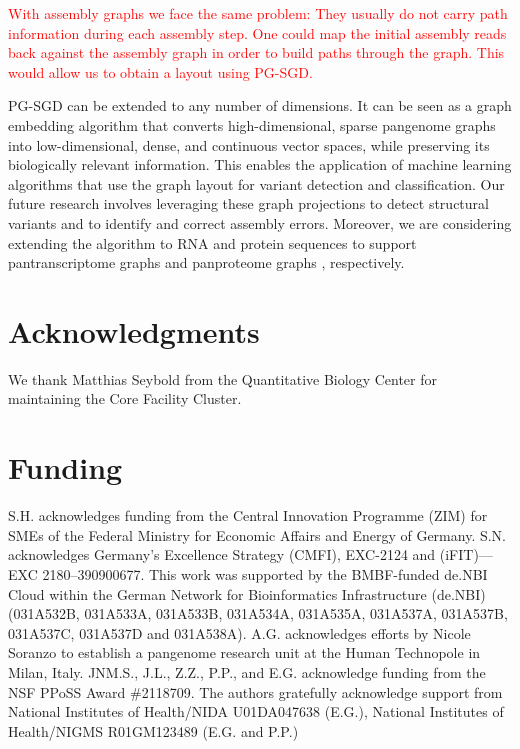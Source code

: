 \documentclass{bioinfo}
\theoremstyle{definition}
\newcommand{\red}[1]{{\textcolor{Red}{#1}}}
\begin{document}
	\red{With assembly graphs we face the same problem: They usually do not carry path information during each assembly step. 
	One could map the initial assembly reads back against the assembly graph in order to build paths through the graph. This would allow us to obtain a layout using PG-SGD.}	 

	PG-SGD can be extended to any number of dimensions.
	It can be seen as a graph embedding algorithm that converts high-dimensional, sparse pangenome graphs into low-dimensional, dense, and continuous vector spaces, while preserving its biologically relevant information.
	This enables the application of machine learning algorithms that use the graph layout for variant detection and classification. 
	Our future research involves leveraging these graph projections to detect structural variants and to identify and correct assembly errors. 
	Moreover, we are considering extending the algorithm to RNA and protein sequences to support pantranscriptome graphs \citep{sibbesen_haplotype-aware_2023} and panproteome graphs \citep{dabbaghie_panpa:_2023}, respectively.

	\section*{Acknowledgments}

	We thank Matthias Seybold from the Quantitative Biology Center for maintaining the Core Facility Cluster.
	
	\section*{Funding}
	
	S.H. acknowledges funding from the Central Innovation Programme (ZIM) for SMEs of the Federal Ministry for Economic Affairs and Energy of Germany.
	S.N. acknowledges Germany’s Excellence Strategy (CMFI), EXC-2124 and (iFIT)—EXC 2180–390900677.
	This work was supported by the BMBF-funded de.NBI Cloud within the German Network for Bioinformatics Infrastructure (de.NBI) (031A532B, 031A533A, 031A533B, 031A534A, 031A535A, 031A537A, 031A537B, 031A537C, 031A537D and 031A538A).
	A.G. acknowledges efforts by Nicole Soranzo to establish a pangenome research unit at the Human Technopole in Milan, Italy.
	JNM.S., J.L., Z.Z., P.P., and E.G. acknowledge funding from the NSF PPoSS Award \#2118709. The authors gratefully acknowledge support from National Institutes of Health/NIDA U01DA047638 (E.G.), National Institutes of Health/NIGMS R01GM123489 (E.G. and P.P.)
	
\end{document}
